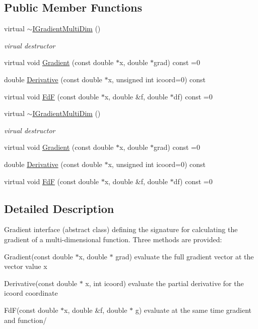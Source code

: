 \subsection*{Public Member Functions}
\begin{DoxyCompactItemize}
\item 
virtual \mbox{\hyperlink{classROOT_1_1Math_1_1IGradientMultiDim_a68ce0f439481e78992945f7d8b8fb42e}{$\sim$\+I\+Gradient\+Multi\+Dim}} ()
\begin{DoxyCompactList}\small\item\em virual destructor \end{DoxyCompactList}\item 
virtual void \mbox{\hyperlink{classROOT_1_1Math_1_1IGradientMultiDim_ac5785e2df4fa36061bf9ddbb9ce4dde0}{Gradient}} (const double $\ast$x, double $\ast$grad) const =0
\item 
double \mbox{\hyperlink{classROOT_1_1Math_1_1IGradientMultiDim_ae131d6cc942c8fcf90a3b575335b30a7}{Derivative}} (const double $\ast$x, unsigned int icoord=0) const
\item 
virtual void \mbox{\hyperlink{classROOT_1_1Math_1_1IGradientMultiDim_ad8d0e31b786327014524483a708d8f82}{FdF}} (const double $\ast$x, double \&f, double $\ast$df) const =0
\item 
virtual \mbox{\hyperlink{classROOT_1_1Math_1_1IGradientMultiDim_a68ce0f439481e78992945f7d8b8fb42e}{$\sim$\+I\+Gradient\+Multi\+Dim}} ()
\begin{DoxyCompactList}\small\item\em virual destructor \end{DoxyCompactList}\item 
virtual void \mbox{\hyperlink{classROOT_1_1Math_1_1IGradientMultiDim_ac5785e2df4fa36061bf9ddbb9ce4dde0}{Gradient}} (const double $\ast$x, double $\ast$grad) const =0
\item 
double \mbox{\hyperlink{classROOT_1_1Math_1_1IGradientMultiDim_ae131d6cc942c8fcf90a3b575335b30a7}{Derivative}} (const double $\ast$x, unsigned int icoord=0) const
\item 
virtual void \mbox{\hyperlink{classROOT_1_1Math_1_1IGradientMultiDim_ad8d0e31b786327014524483a708d8f82}{FdF}} (const double $\ast$x, double \&f, double $\ast$df) const =0
\end{DoxyCompactItemize}


\subsection{Detailed Description}
Gradient interface (abstract class) defining the signature for calculating the gradient of a multi-\/dimensional function. Three methods are provided\+:
\begin{DoxyItemize}
\item Gradient(const double $\ast$x, double $\ast$ grad) evaluate the full gradient vector at the vector value x
\item Derivative(const double $\ast$ x, int icoord) evaluate the partial derivative for the icoord coordinate
\item Fd\+F(const double $\ast$x, double \&f, double $\ast$ g) evaluate at the same time gradient and function/
\end{DoxyItemize}

